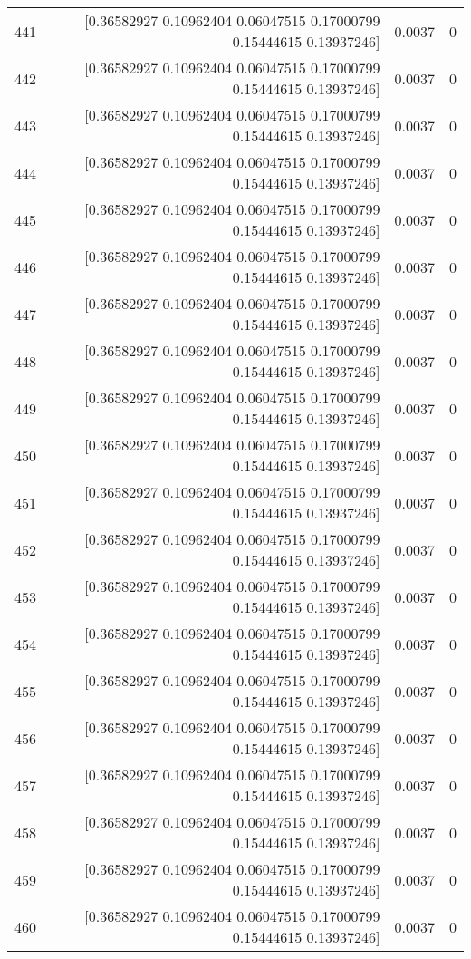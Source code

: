 \begin{longtable}{lrrr}
441 & [0.36582927 0.10962404 0.06047515 0.17000799 0.15444615 0.13937246] & 0.0037 & 0 \\
442 & [0.36582927 0.10962404 0.06047515 0.17000799 0.15444615 0.13937246] & 0.0037 & 0 \\
443 & [0.36582927 0.10962404 0.06047515 0.17000799 0.15444615 0.13937246] & 0.0037 & 0 \\
444 & [0.36582927 0.10962404 0.06047515 0.17000799 0.15444615 0.13937246] & 0.0037 & 0 \\
445 & [0.36582927 0.10962404 0.06047515 0.17000799 0.15444615 0.13937246] & 0.0037 & 0 \\
446 & [0.36582927 0.10962404 0.06047515 0.17000799 0.15444615 0.13937246] & 0.0037 & 0 \\
447 & [0.36582927 0.10962404 0.06047515 0.17000799 0.15444615 0.13937246] & 0.0037 & 0 \\
448 & [0.36582927 0.10962404 0.06047515 0.17000799 0.15444615 0.13937246] & 0.0037 & 0 \\
449 & [0.36582927 0.10962404 0.06047515 0.17000799 0.15444615 0.13937246] & 0.0037 & 0 \\
450 & [0.36582927 0.10962404 0.06047515 0.17000799 0.15444615 0.13937246] & 0.0037 & 0 \\
451 & [0.36582927 0.10962404 0.06047515 0.17000799 0.15444615 0.13937246] & 0.0037 & 0 \\
452 & [0.36582927 0.10962404 0.06047515 0.17000799 0.15444615 0.13937246] & 0.0037 & 0 \\
453 & [0.36582927 0.10962404 0.06047515 0.17000799 0.15444615 0.13937246] & 0.0037 & 0 \\
454 & [0.36582927 0.10962404 0.06047515 0.17000799 0.15444615 0.13937246] & 0.0037 & 0 \\
455 & [0.36582927 0.10962404 0.06047515 0.17000799 0.15444615 0.13937246] & 0.0037 & 0 \\
456 & [0.36582927 0.10962404 0.06047515 0.17000799 0.15444615 0.13937246] & 0.0037 & 0 \\
457 & [0.36582927 0.10962404 0.06047515 0.17000799 0.15444615 0.13937246] & 0.0037 & 0 \\
458 & [0.36582927 0.10962404 0.06047515 0.17000799 0.15444615 0.13937246] & 0.0037 & 0 \\
459 & [0.36582927 0.10962404 0.06047515 0.17000799 0.15444615 0.13937246] & 0.0037 & 0 \\
460 & [0.36582927 0.10962404 0.06047515 0.17000799 0.15444615 0.13937246] & 0.0037 & 0 \\

\end{longtable}
